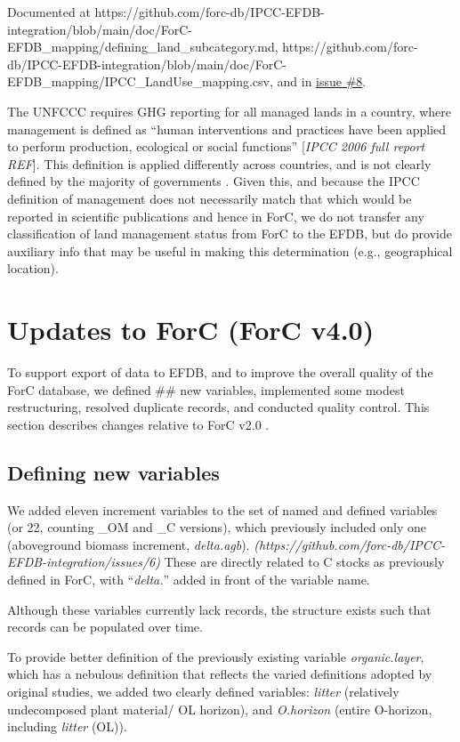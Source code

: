 \documentclass[, manuscript]{copernicus}
\begin{document}
Documented at
https://github.com/forc-db/IPCC-EFDB-integration/blob/main/doc/ForC-EFDB\_mapping/defining\_land\_subcategory.md,
https://github.com/forc-db/IPCC-EFDB-integration/blob/main/doc/ForC-EFDB\_mapping/IPCC\_LandUse\_mapping.csv,
and in
\href{https://github.com/forc-db/IPCC_database_integration/issues/8}{issue
\#8}.

The UNFCCC requires GHG reporting for all managed lands in a country,
where management is defined as ``human interventions and practices have
been applied to perform production, ecological or social functions''
{[}\emph{IPCC 2006 full report REF}{]}. This definition is applied
differently across countries, and is not clearly defined by the majority
of governments \citep{ogle_delineating_2018}. Given this, and because
the IPCC definition of management does not necessarily match that which
would be reported in scientific publications and hence in ForC, we do
not transfer any classification of land management status from ForC to
the EFDB, but do provide auxiliary info that may be useful in making
this determination (e.g., geographical location).

\section{Updates to ForC (ForC v4.0)}

To support export of data to EFDB, and to improve the overall quality of
the ForC database, we defined \#\# new variables, implemented some
modest restructuring, resolved duplicate records, and conducted quality
control. This section describes changes relative to ForC v2.0
\citep{anderson-teixeira_forc_2018}.

\subsection{Defining new variables}

We added eleven increment variables to the set of named and defined
variables (or 22, counting \_OM and \_C versions), which previously
included only one (aboveground biomass increment, \emph{delta.agb}).
\emph{(https://github.com/forc-db/IPCC-EFDB-integration/issues/6)} These
are directly related to C stocks as previously defined in ForC, with
``\emph{delta.}'' added in front of the variable name.

Although these variables currently lack records, the structure exists
such that records can be populated over time.

To provide better definition of the previously existing variable
\emph{organic.layer}, which has a nebulous definition that reflects the
varied definitions adopted by original studies, we added two clearly
defined variables: \emph{litter} (relatively undecomposed plant
material/ OL horizon), and \emph{O.horizon} (entire O-horizon, including
\emph{litter} (OL)).
\end{document}
